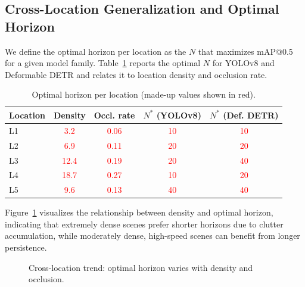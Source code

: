 \documentclass[twocolumn, 10pt]{article}
\newcommand{\ph}[1]{\textcolor{red}{#1}}
\begin{document}
\subsection{Cross-Location Generalization and Optimal Horizon}
We define the optimal horizon per location as the $N$ that maximizes mAP@0.5 for a given model family. Table~\ref{tab:optimalN} reports the optimal $N$ for YOLOv8 and Deformable DETR and relates it to location density and occlusion rate.

\begin{table}[t]
\centering
\caption{Optimal horizon per location (made-up values shown in red).}
\label{tab:optimalN}
\begin{tabular}{@{}lcccc@{}}
\toprule
\textbf{Location} & Density & Occl. rate & $N^*$ (YOLOv8) & $N^*$ (Def. DETR) \\
\midrule
L1 & \ph{3.2}  & \ph{0.06} & \ph{10} & \ph{10} \\
L2 & \ph{6.9}  & \ph{0.11} & \ph{20} & \ph{20} \\
L3 & \ph{12.4} & \ph{0.19} & \ph{20} & \ph{40} \\
L4 & \ph{18.7} & \ph{0.27} & \ph{10} & \ph{20} \\
L5 & \ph{9.6}  & \ph{0.13} & \ph{40} & \ph{40} \\
\bottomrule
\end{tabular}
\end{table}

Figure~\ref{fig:optimal_scatter} visualizes the relationship between density and optimal horizon, indicating that extremely dense scenes prefer shorter horizons due to clutter accumulation, while moderately dense, high-speed scenes can benefit from longer persistence.

\begin{figure}[t]
\centering
{}
\caption{Cross-location trend: optimal horizon varies with density and occlusion.}
\label{fig:optimal_scatter}
\end{figure}
\end{document}
